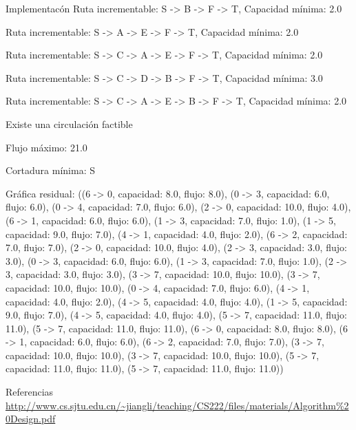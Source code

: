 \documentclass{article}
\begin{document}
\begin{section} {Implementacón}
	Ruta incrementable: S -> B -> F -> T, Capacidad mínima: 2.0
	
	Ruta incrementable: S -> A -> E -> F -> T, Capacidad mínima: 2.0
	
	Ruta incrementable: S -> C -> A -> E -> F -> T, Capacidad mínima: 2.0
	
	Ruta incrementable: S -> C -> D -> B -> F -> T, Capacidad mínima: 3.0
	
	Ruta incrementable: S -> C -> A -> E -> B -> F -> T, Capacidad mínima: 2.0
	
	Existe una circulación factible 
	
	Flujo máximo: 21.0
	
	Cortadura mínima: S
	
	Gráfica residual: ((6 -> 0, capacidad: 8.0, flujo: 8.0), (0 -> 3, capacidad: 6.0, flujo: 6.0), (0 -> 4, capacidad: 7.0, flujo: 6.0), (2 -> 0, capacidad: 10.0, flujo: 4.0), (6 -> 1, capacidad: 6.0, flujo: 6.0), (1 -> 3, capacidad: 7.0, flujo: 1.0), (1 -> 5, capacidad: 9.0, flujo: 7.0), (4 -> 1, capacidad: 4.0, flujo: 2.0), (6 -> 2, capacidad: 7.0, flujo: 7.0), (2 -> 0, capacidad: 10.0, flujo: 4.0), (2 -> 3, capacidad: 3.0, flujo: 3.0), (0 -> 3, capacidad: 6.0, flujo: 6.0), (1 -> 3, capacidad: 7.0, flujo: 1.0), (2 -> 3, capacidad: 3.0, flujo: 3.0), (3 -> 7, capacidad: 10.0, flujo: 10.0), (3 -> 7, capacidad: 10.0, flujo: 10.0), (0 -> 4, capacidad: 7.0, flujo: 6.0), (4 -> 1, capacidad: 4.0, flujo: 2.0), (4 -> 5, capacidad: 4.0, flujo: 4.0), (1 -> 5, capacidad: 9.0, flujo: 7.0), (4 -> 5, capacidad: 4.0, flujo: 4.0), (5 -> 7, capacidad: 11.0, flujo: 11.0), (5 -> 7, capacidad: 11.0, flujo: 11.0), (6 -> 0, capacidad: 8.0, flujo: 8.0), (6 -> 1, capacidad: 6.0, flujo: 6.0), (6 -> 2, capacidad: 7.0, flujo: 7.0), (3 -> 7, capacidad: 10.0, flujo: 10.0), (3 -> 7, capacidad: 10.0, flujo: 10.0), (5 -> 7, capacidad: 11.0, flujo: 11.0), (5 -> 7, capacidad: 11.0, flujo: 11.0))
	
	
\end{section}

\begin{section}{Referencias}
	\url{http://www.cs.sjtu.edu.cn/~jiangli/teaching/CS222/files/materials/Algorithm%20Design.pdf}
\end{section}
\end{document}
